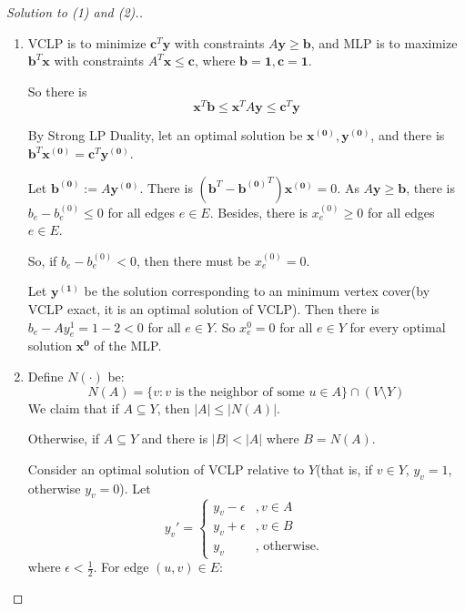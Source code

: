 \begin{proof}[Solution to (1) and (2).]
\begin{enumerate}
            So $K_4$ is an example which is MLP exact but not VCLP exact.
  
            In (3) and (4), suppose that $Y$ is a minimum vertex cover of $G$. Note that there is no edge $(u, v) \in E$ such that both $u, v \in V \setminus Y$. Because $u, v \in V \setminus Y$ means that $(u, v)$ is not covered by $Y$, which is contradict with $Y$ being a vertex cover.

            \item VCLP is to minimize $\mathbf{c}^T\mathbf{y}$ with constraints $A \mathbf{y}\geq \mathbf{b}$, and MLP is to maximize $\mathbf{b}^T\mathbf{x}$ with constraints $A^T \mathbf{x} \leq \mathbf{c}$, where $\mathbf{b} = \mathbf{1}, \mathbf{c} = \mathbf{1}$. 
            
            So there is $$\mathbf{x}^T \mathbf{b} \leq \mathbf{x}^T A \mathbf{y} \leq \mathbf{c}^T \mathbf{y}$$

            By Strong LP Duality, let an optimal solution be $\mathbf{x^{(0)}},\mathbf{y^{(0)}}$, and there is $\mathbf{b}^T \mathbf{x^{(0)}} = \mathbf{c}^T \mathbf{y^{(0)}}$.
            
            Let $\mathbf{b^{(0)}} := A\mathbf{y^{(0)}}$. There is $(\mathbf{b}^T - {\mathbf{b^{(0)}}}^T) \mathbf{x^{(0)}} = 0$. As $A \mathbf{y} \geq \mathbf{b}$, there is $b_e - b^{(0)}_e \leq 0$ for all edges $e \in E$. Besides, there is $x^{(0)}_e \geq 0$ for all edges $e \in E$.

            So, if $b_e - b^{(0)}_e < 0$, then there must be $x^{(0)}_e = 0$.

            Let $\mathbf{y^{(1)}}$ be the solution corresponding to an minimum vertex cover(by VCLP exact, it is an optimal solution of VCLP). Then there is 
            $b_e-Ay^{1}_e=1-2<0$ for all $e\in Y$. So $x^{0}_e=0$ for all $e\in Y$ for every optimal solution $\mathbf{x^{0}}$ of the MLP.
            
            \item Define $N(\cdot)$ be: 
            $$N(A)=\{v:v\text{ is the neighbor of some }u\in A\}\cap (V \setminus Y)$$
            We claim that if $A\subseteq Y$, then $|A|\leq |N(A)|$. 

            Otherwise, if $A\subseteq Y$ and there is $|B|<|A|$ where $B=N(A)$. 

            Consider an optimal solution of VCLP relative to $Y$(that is, if $v\in Y$, $y_v=1$, otherwise $y_v=0$). Let 
            \begin{equation*}
                y_v'=
                \begin{cases}
                    y_v-\epsilon&,v\in A\\
                    y_v+\epsilon&,v\in B\\
                    y_v &,\text{ otherwise. }
                \end{cases}
            \end{equation*}
            where $\epsilon < \frac{1}{2}$. For edge $(u, v) \in E$: 
    

\end{enumerate}
\end{proof}
